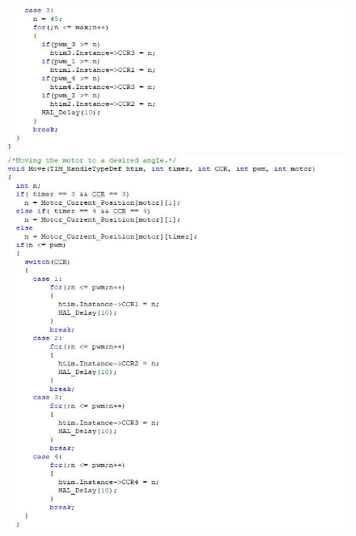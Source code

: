 	\begin{figure}[!h]
	\centering
	\includegraphics[width=\columnwidth]{./Images/Appendix/IMG_7.JPG}
	\includegraphics[width=\columnwidth]{./Images/Appendix/IMG_8.JPG}
	\end{figure}
	
